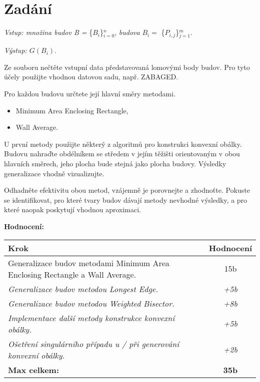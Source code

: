 \chapter*{Zadání}

\par\emph{Vstup: množina budov B =} \{$B_i$\}$_{i=0}^n$, \emph{budova} $B_i = $  \{$P_{i,j}$\}$_{j=1}^m$.
\par \emph{Výstup: $G(B_i)$}.

\par Ze souboru nečtěte vstupní data představovaná lomovými body budov. Pro tyto účely použijte vhodnou datovou sadu, např. ZABAGED.
\par Pro každou budovu určtete její hlavní směry metodami.

\begin{itemize}
  \item Minimum Area Enclosing Rectangle,
  \item Wall Average.
\end{itemize}

\par U první metody použijte některý z algoritmů pro konstrukci konvexní obálky. Budovu nahraďte obdélníkem se středem v jejím těžišti orientovaným v obou hlavních směrech, jeho plocha bude stejná jako plocha budovy. Výsledky generalizace vhodně vizualizujte.
\par Odhadněte efektivitu obou metod, vzájemně je porovnejte a zhodnoťte. Pokuste se identifikovat, pro které tvary budov dávají metody nevhodné výsledky, a pro které naopak poskytují vhodnou aproximaci.
\bigbreak

\par\textbf{\large Hodnocení:}
\bigbreak
\begin{center}
    \begin{tabular}{|p{14.2cm}|c|} 
     \hline\large
         \textbf{Krok} & \textbf{Hodnocení}\\ %
             \hline\hline
             \small Generalizace budov metodami Minimum Area Enclosing Rectangle a Wall Average. & \small15b \\ 
             \hline
             \emph{\small Generalizace budov metodou Longest Edge.} & \emph{\small +5b} \\
             \hline
             \emph{\small Generalizace budov metodou Weighted Bisector.} & \emph{\small +8b} \\
             \hline
             \emph{\small Implementace další metody konstrukce konvexní obálky.} & \emph{\small +5b} \\
             \hline
             \emph{\small Ošetření singulárního případu u / při generování konvexní obálky.} & \emph{\small +2b}\\ 
             \hline
             \textbf{Max celkem:} & \textbf{35b}\\ %
             \hline
    \end{tabular}
\end{center}
